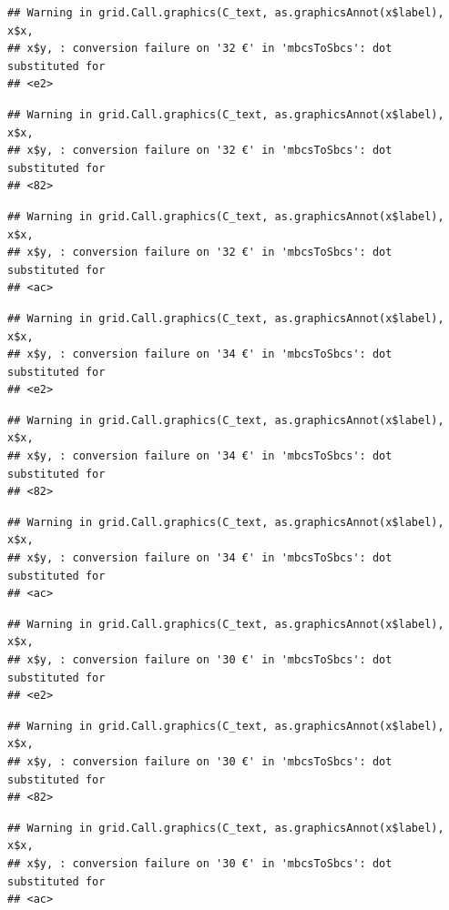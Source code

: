 \documentclass[]{gitbook}
\begin{document}
\begin{verbatim}
## Warning in grid.Call.graphics(C_text, as.graphicsAnnot(x$label), x$x,
## x$y, : conversion failure on '32 €' in 'mbcsToSbcs': dot substituted for
## <e2>
\end{verbatim}

\begin{verbatim}
## Warning in grid.Call.graphics(C_text, as.graphicsAnnot(x$label), x$x,
## x$y, : conversion failure on '32 €' in 'mbcsToSbcs': dot substituted for
## <82>
\end{verbatim}

\begin{verbatim}
## Warning in grid.Call.graphics(C_text, as.graphicsAnnot(x$label), x$x,
## x$y, : conversion failure on '32 €' in 'mbcsToSbcs': dot substituted for
## <ac>
\end{verbatim}

\begin{verbatim}
## Warning in grid.Call.graphics(C_text, as.graphicsAnnot(x$label), x$x,
## x$y, : conversion failure on '34 €' in 'mbcsToSbcs': dot substituted for
## <e2>
\end{verbatim}

\begin{verbatim}
## Warning in grid.Call.graphics(C_text, as.graphicsAnnot(x$label), x$x,
## x$y, : conversion failure on '34 €' in 'mbcsToSbcs': dot substituted for
## <82>
\end{verbatim}

\begin{verbatim}
## Warning in grid.Call.graphics(C_text, as.graphicsAnnot(x$label), x$x,
## x$y, : conversion failure on '34 €' in 'mbcsToSbcs': dot substituted for
## <ac>
\end{verbatim}

\begin{verbatim}
## Warning in grid.Call.graphics(C_text, as.graphicsAnnot(x$label), x$x,
## x$y, : conversion failure on '30 €' in 'mbcsToSbcs': dot substituted for
## <e2>
\end{verbatim}

\begin{verbatim}
## Warning in grid.Call.graphics(C_text, as.graphicsAnnot(x$label), x$x,
## x$y, : conversion failure on '30 €' in 'mbcsToSbcs': dot substituted for
## <82>
\end{verbatim}

\begin{verbatim}
## Warning in grid.Call.graphics(C_text, as.graphicsAnnot(x$label), x$x,
## x$y, : conversion failure on '30 €' in 'mbcsToSbcs': dot substituted for
## <ac>
\end{verbatim}
\end{document}
